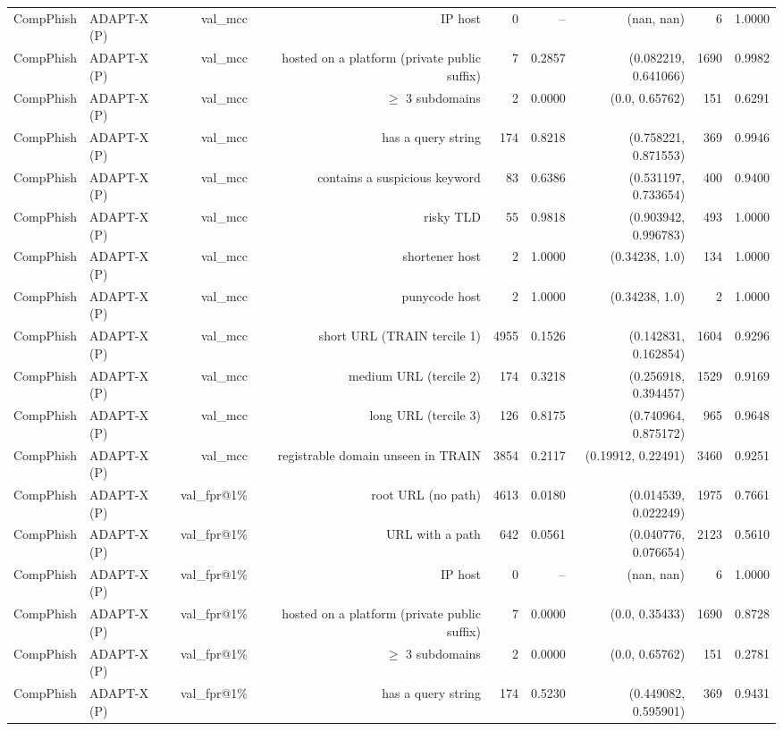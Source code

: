 \begin{table}[t]
\begin{tabular}{llrrrrrrr}
CompPhish & ADAPT-X (P) & val\_mcc & IP host & 0 & -- & (nan, nan) & 6 & 1.0000 \\
CompPhish & ADAPT-X (P) & val\_mcc & hosted on a platform (private public suffix) & 7 & 0.2857 & (0.082219, 0.641066) & 1690 & 0.9982 \\
CompPhish & ADAPT-X (P) & val\_mcc & $\geq$ 3 subdomains & 2 & 0.0000 & (0.0, 0.65762) & 151 & 0.6291 \\
CompPhish & ADAPT-X (P) & val\_mcc & has a query string & 174 & 0.8218 & (0.758221, 0.871553) & 369 & 0.9946 \\
CompPhish & ADAPT-X (P) & val\_mcc & contains a suspicious keyword & 83 & 0.6386 & (0.531197, 0.733654) & 400 & 0.9400 \\
CompPhish & ADAPT-X (P) & val\_mcc & risky TLD & 55 & 0.9818 & (0.903942, 0.996783) & 493 & 1.0000 \\
CompPhish & ADAPT-X (P) & val\_mcc & shortener host & 2 & 1.0000 & (0.34238, 1.0) & 134 & 1.0000 \\
CompPhish & ADAPT-X (P) & val\_mcc & punycode host & 2 & 1.0000 & (0.34238, 1.0) & 2 & 1.0000 \\
CompPhish & ADAPT-X (P) & val\_mcc & short URL (TRAIN tercile 1) & 4955 & 0.1526 & (0.142831, 0.162854) & 1604 & 0.9296 \\
CompPhish & ADAPT-X (P) & val\_mcc & medium URL (tercile 2) & 174 & 0.3218 & (0.256918, 0.394457) & 1529 & 0.9169 \\
CompPhish & ADAPT-X (P) & val\_mcc & long URL (tercile 3) & 126 & 0.8175 & (0.740964, 0.875172) & 965 & 0.9648 \\
CompPhish & ADAPT-X (P) & val\_mcc & registrable domain unseen in TRAIN & 3854 & 0.2117 & (0.19912, 0.22491) & 3460 & 0.9251 \\
CompPhish & ADAPT-X (P) & val\_fpr@1\% & root URL (no path) & 4613 & 0.0180 & (0.014539, 0.022249) & 1975 & 0.7661 \\
CompPhish & ADAPT-X (P) & val\_fpr@1\% & URL with a path & 642 & 0.0561 & (0.040776, 0.076654) & 2123 & 0.5610 \\
CompPhish & ADAPT-X (P) & val\_fpr@1\% & IP host & 0 & -- & (nan, nan) & 6 & 1.0000 \\
CompPhish & ADAPT-X (P) & val\_fpr@1\% & hosted on a platform (private public suffix) & 7 & 0.0000 & (0.0, 0.35433) & 1690 & 0.8728 \\
CompPhish & ADAPT-X (P) & val\_fpr@1\% & $\geq$ 3 subdomains & 2 & 0.0000 & (0.0, 0.65762) & 151 & 0.2781 \\
CompPhish & ADAPT-X (P) & val\_fpr@1\% & has a query string & 174 & 0.5230 & (0.449082, 0.595901) & 369 & 0.9431 \\

\end{tabular}
\end{table}
